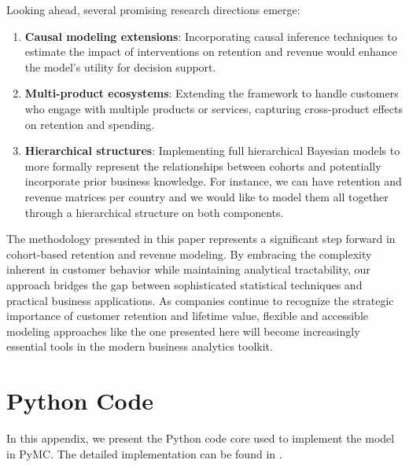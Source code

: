 \documentclass[11pt]{amsart}
\theoremstyle{definition}
\begin{document}
Looking ahead, several promising research directions emerge:

\begin{enumerate}
    \item \textbf{Causal modeling extensions}: Incorporating causal inference techniques to estimate the impact of
          interventions on retention and revenue would enhance the model's utility for decision support.

    \item \textbf{Multi-product ecosystems}: Extending the framework to handle customers who engage with multiple products or
          services, capturing cross-product effects on retention and spending.

    \item \textbf{Hierarchical structures}: Implementing full hierarchical Bayesian models to more formally represent the
          relationships between cohorts and potentially incorporate prior business knowledge. For instance, we can have
          retention and revenue matrices per country and we would like to model them all together through a hierarchical
          structure on both components.
\end{enumerate}

The methodology presented in this paper represents a significant step forward in cohort-based retention and revenue modeling.
By embracing the complexity inherent in customer behavior while maintaining analytical tractability, our approach bridges the
gap between sophisticated statistical techniques and practical business applications. As companies continue to recognize the
strategic importance of customer retention and lifetime value, flexible and accessible modeling approaches like the one presented
here will become increasingly essential tools in the modern business analytics toolkit.

\appendix

\section{Python Code}\label{sec:appendix}

In this appendix, we present the Python code core used to implement the model in PyMC.
The detailed implementation can be found in \cite{orduz_revenue_retention}.
\end{document}
